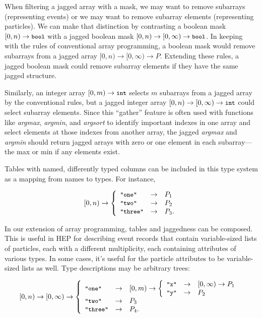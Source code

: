 \documentclass{webofc}
\begin{document}
When filtering a jagged array with a mask, we may want to remove subarrays (representing events) or we may want to remove subarray elements (representing particles). We can make that distinction by contrasting a boolean mask $[0, n) \to \mbox{\small\tt bool}$ with a jagged boolean mask $[0, n) \to [0, \infty) \to \mbox{\small\tt bool}$. In keeping with the rules of conventional array programming, a boolean mask would remove subarrays from a jagged array $[0, n) \to [0, \infty) \to P$. Extending these rules, a jagged boolean mask could remove subarray elements if they have the same jagged structure.

Similarly, an integer array $[0, m) \to \mbox{\small\tt int}$ selects $m$ subarrays from a jagged array by the conventional rules, but a jagged integer array $[0, n) \to [0, \infty) \to \mbox{\small\tt int}$ could select subarray elements. Since this ``gather'' feature is often used with functions like {\it argmax}, {\it argmin}, and {\it argsort} to identify important indexes in one array and select elements at those indexes from another array, the jagged {\it argmax} and {\it argmin} should return jagged arrays with zero or one element in each subarray--- the max or min if any elements exist.

Tables with named, differently typed columns can be included in this type system as a mapping from names to types. For instance,

\[ [0, n) \to \left\{\begin{array}{l c l}
\mbox{\small\tt "one"} & \to & P_1 \\
\mbox{\small\tt "two"} & \to & P_2 \\
\mbox{\small\tt "three"} & \to & P_3\mbox{.} \end{array}\right. \]

\noindent In our extension of array programming, tables and jaggedness can be composed. This is useful in HEP for describing event records that contain variable-sized lists of particles, each with a different multiplicity, each containing attributes of various types. In some cases, it's useful for the particle attributes to be variable-sized lists as well. Type descriptions may be arbitrary trees:

\[ [0, n) \to [0, \infty) \to \left\{\begin{array}{l c l}
\mbox{\small\tt "one"} & \to & [0, m) \to \left \{\begin{array}{l c l} \mbox{\small\tt "x"} & \to & [0, \infty) \to P_1 \\ \mbox{\small\tt "y"} & \to & P_2 \end{array}\right. \\
\mbox{\small\tt "two"} & \to & P_3 \\
\mbox{\small\tt "three"} & \to & P_4\mbox{.} \end{array}\right. \]
\end{document}

